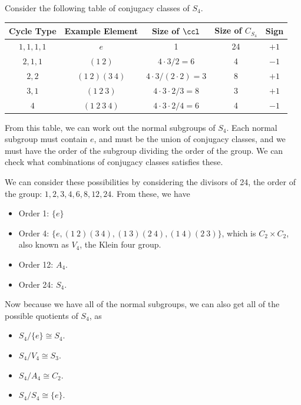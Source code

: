 \begin{example}
	Consider the following table of conjugacy classes of $S_4$.
	\begin{center}
			\begin{tabular}{@{}ccccc@{}}
			\toprule
			Cycle Type & Example Element & Size of $\ccl$ & Size of $C_{S_4}$ & Sign \\ \midrule
			$1, 1, 1, 1$ & $e$   & 1                       &  24           & $+1$    \\
			$2, 1, 1$		& $(1\ 2)$        &     $4 \cdot 3 / 2 = 6$     &        4      &  $-1$    \\ 
			$2, 2$  & $(1\ 2)(3\ 4)$  & $4 \cdot 3 / (2 \cdot 2) = 3$                          &      8        &   $+1$   \\ 
			$3, 1$		   & $(1\ 2\ 3)$               &  $4 \cdot 3 \cdot 2 / 3 = 8$                       &        3      &  $+1$    \\ 
			$4$		   & $(1\ 2\ 3\ 4)$              &    $4 \cdot 3 \cdot 2 / 4 = 6$                     &        4      &  $-1$    \\ 
			\bottomrule
			\end{tabular}
		\end{center}
		From this table, we can work out the normal subgroups of $S_4$. Each normal subgroup must contain $e$, and must be the union of conjugacy classes, and we must have the order of the subgroup dividing the order of the group. We can check what combinations of conjugacy classes satisfies these.

		We can consider these possibilities by considering the divisors of 24, the order of the group: $1, 2, 3, 4, 6, 8, 12, 24$. From these, we have
		\begin{itemize}
			\item Order 1: $\{e\}$
			\item Order 4: $\{e, (1\ 2)(3\ 4), (1\ 3)(2\ 4), (1\ 4)(2\ 3)\}$, which is $C_2 \times C_2$, also known as $V_4$, the Klein four group.
			\item Order 12: $A_4$.
			\item Order 24: $S_4$.
		\end{itemize}

		Now because we have all of the normal subgroups, we can also get all of the possible quotients of $S_4$, as
		\begin{itemize}
			\item $S_4/\{e\} \cong S_4$.
			\item $S_4 / V_4 \cong S_3$.
			\item $S_4/A_4 \cong C_2$.
			\item $S_4 / S_4 \cong \{e\}$.
		\end{itemize}
\end{example}

